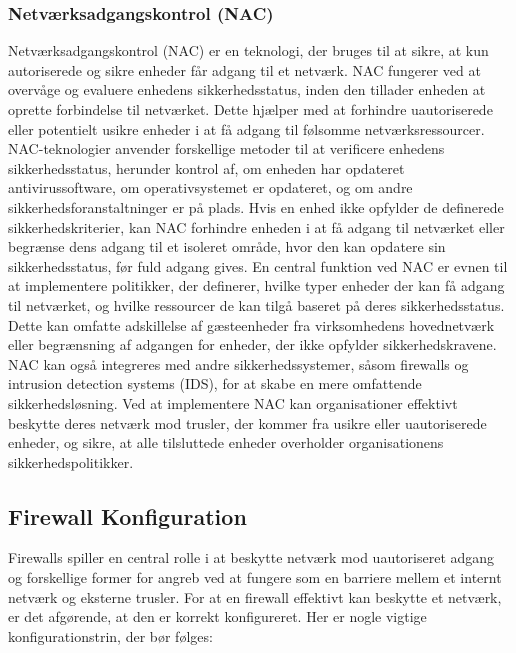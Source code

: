 \subsubsection{Netværksadgangskontrol (NAC)}
Netværksadgangskontrol (NAC) er en teknologi, der bruges til at sikre, at kun autoriserede og sikre enheder får adgang til et netværk. NAC fungerer ved at overvåge og evaluere enhedens sikkerhedsstatus, inden den tillader enheden at oprette forbindelse til netværket. Dette hjælper med at forhindre uautoriserede eller potentielt usikre enheder i at få adgang til følsomme netværksressourcer.
\newline\newline\noindent
NAC-teknologier anvender forskellige metoder til at verificere enhedens sikkerhedsstatus, herunder kontrol af, om enheden har opdateret antivirussoftware, om operativsystemet er opdateret, og om andre sikkerhedsforanstaltninger er på plads. Hvis en enhed ikke opfylder de definerede sikkerhedskriterier, kan NAC forhindre enheden i at få adgang til netværket eller begrænse dens adgang til et isoleret område, hvor den kan opdatere sin sikkerhedsstatus, før fuld adgang gives.
\newline\newline\noindent
En central funktion ved NAC er evnen til at implementere politikker, der definerer, hvilke typer enheder der kan få adgang til netværket, og hvilke ressourcer de kan tilgå baseret på deres sikkerhedsstatus. Dette kan omfatte adskillelse af gæsteenheder fra virksomhedens hovednetværk eller begrænsning af adgangen for enheder, der ikke opfylder sikkerhedskravene.
\newline\newline\noindent
NAC kan også integreres med andre sikkerhedssystemer, såsom firewalls og intrusion detection systems (IDS), for at skabe en mere omfattende sikkerhedsløsning. Ved at implementere NAC kan organisationer effektivt beskytte deres netværk mod trusler, der kommer fra usikre eller uautoriserede enheder, og sikre, at alle tilsluttede enheder overholder organisationens sikkerhedspolitikker.


\subsection{Firewall Konfiguration}
Firewalls spiller en central rolle i at beskytte netværk mod uautoriseret adgang og forskellige former for angreb ved at fungere som en barriere mellem et internt netværk og eksterne trusler. For at en firewall effektivt kan beskytte et netværk, er det afgørende, at den er korrekt konfigureret. Her er nogle vigtige konfigurationstrin, der bør følges:

